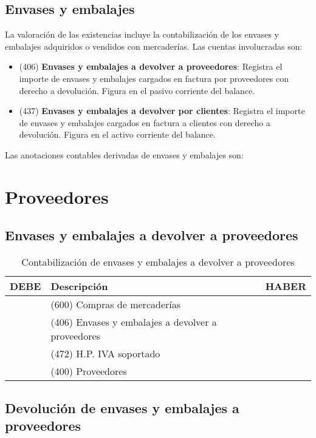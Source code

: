 \documentclass{article}
\begin{document}
\subsection{Envases y embalajes}

La valoración de las existencias incluye la contabilización de los envases y embalajes adquiridos o vendidos con mercaderías. Las cuentas involucradas son:

\begin{itemize}
    \item (406) \textbf{Envases y embalajes a devolver a proveedores}: Registra el importe de envases y embalajes cargados en factura por proveedores con derecho a devolución. Figura en el pasivo corriente del balance.
    \item (437) \textbf{Envases y embalajes a devolver por clientes}: Registra el importe de envases y embalajes cargados en factura a clientes con derecho a devolución. Figura en el activo corriente del balance.
\end{itemize}

Las anotaciones contables derivadas de envases y embalajes son:

\section*{Proveedores}

\subsection*{Envases y embalajes a devolver a proveedores}

\begin{table}[H]
\centering
\begin{tabular}{|p{4cm}|p{4cm}|p{4cm}|}
\hline
\textbf{DEBE} & \textbf{Descripción} & \textbf{HABER} \\
\hline
& (600) Compras de mercaderías & \\
& (406) Envases y embalajes a devolver a proveedores & \\
& (472) H.P. IVA soportado & \\
&  (400) Proveedores & \\
\hline
\end{tabular}
\caption{Contabilización de envases y embalajes a devolver a proveedores}
\end{table}

\subsection*{Devolución de envases y embalajes a proveedores}
\end{document}

